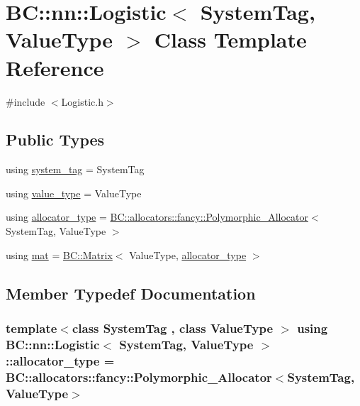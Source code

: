 \hypertarget{classBC_1_1nn_1_1Logistic}{}\section{BC\+:\+:nn\+:\+:Logistic$<$ System\+Tag, Value\+Type $>$ Class Template Reference}
\label{classBC_1_1nn_1_1Logistic}


{\ttfamily \#include $<$Logistic.\+h$>$}

\subsection*{Public Types}
\begin{DoxyCompactItemize}
\item 
using \hyperlink{classBC_1_1nn_1_1Logistic_a7c4cfbab1cbfb49d3842f4eec0b9f67e}{system\+\_\+tag} = System\+Tag
\item 
using \hyperlink{classBC_1_1nn_1_1Logistic_a06cf2a7fa68ff21ced567a9fc1b1e8f3}{value\+\_\+type} = Value\+Type
\item 
using \hyperlink{classBC_1_1nn_1_1Logistic_a8ab2ec1f6dc75a0da720706d77c3e4f3}{allocator\+\_\+type} = \hyperlink{structBC_1_1allocators_1_1fancy_1_1Polymorphic__Allocator}{B\+C\+::allocators\+::fancy\+::\+Polymorphic\+\_\+\+Allocator}$<$ System\+Tag, Value\+Type $>$
\item 
using \hyperlink{classBC_1_1nn_1_1Logistic_ad65129493265072dc1083ea1e8dabc12}{mat} = \hyperlink{namespaceBC_1_1tensors_1_1common__using_a6fc3153d379a42b1a97df46ed5b71a29}{B\+C\+::\+Matrix}$<$ Value\+Type, \hyperlink{classBC_1_1nn_1_1Logistic_a8ab2ec1f6dc75a0da720706d77c3e4f3}{allocator\+\_\+type} $>$
\end{DoxyCompactItemize}


\subsection{Member Typedef Documentation}
\subsubsection[{\texorpdfstring{allocator\+\_\+type}{allocator_type}}]{\setlength{\rightskip}{0pt plus 5cm}template$<$class System\+Tag , class Value\+Type $>$ using {\bf B\+C\+::nn\+::\+Logistic}$<$ System\+Tag, Value\+Type $>$\+::{\bf allocator\+\_\+type} =  {\bf B\+C\+::allocators\+::fancy\+::\+Polymorphic\+\_\+\+Allocator}$<$System\+Tag, Value\+Type$>$}\hypertarget{classBC_1_1nn_1_1Logistic_a8ab2ec1f6dc75a0da720706d77c3e4f3}{}\label{classBC_1_1nn_1_1Logistic_a8ab2ec1f6dc75a0da720706d77c3e4f3}

